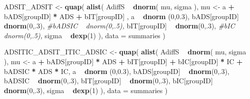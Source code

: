 \documentclass[10pt,dvipsnames,enabledeprecatedfontcommands]{scrartcl}
\newenvironment{Shaded}{\begin{snugshade}}{\end{snugshade}}
\newcommand{\KeywordTok}[1]{\textcolor[rgb]{0.13,0.29,0.53}{\textbf{#1}}}
\newcommand{\DataTypeTok}[1]{\textcolor[rgb]{0.13,0.29,0.53}{#1}}
\newcommand{\DecValTok}[1]{\textcolor[rgb]{0.00,0.00,0.81}{#1}}
\newcommand{\FloatTok}[1]{\textcolor[rgb]{0.00,0.00,0.81}{#1}}
\newcommand{\StringTok}[1]{\textcolor[rgb]{0.31,0.60,0.02}{#1}}
\newcommand{\CommentTok}[1]{\textcolor[rgb]{0.56,0.35,0.01}{\textit{#1}}}
\newcommand{\OperatorTok}[1]{\textcolor[rgb]{0.81,0.36,0.00}{\textbf{#1}}}
\newcommand{\NormalTok}[1]{#1}
\begin{document}
\begin{Shaded}
\begin{Highlighting}[]
\NormalTok{ADSIT_ADSIT <-}\StringTok{ }\KeywordTok{quap}\NormalTok{(}
  \KeywordTok{alist}\NormalTok{(}
\NormalTok{    AdiffS }\OperatorTok{~}\StringTok{ }\KeywordTok{dnorm}\NormalTok{( mu, sigma ),}
\NormalTok{    mu <-}\StringTok{ }\NormalTok{a }\OperatorTok{+}\StringTok{ }\NormalTok{bADS[groupID] }\OperatorTok{*}\StringTok{ }\NormalTok{ADS }\OperatorTok{+}\StringTok{  }\NormalTok{bIT[groupID] ,}
\NormalTok{    a }\OperatorTok{~}\StringTok{ }\KeywordTok{dnorm}\NormalTok{ (}\DecValTok{0}\NormalTok{,}\FloatTok{0.3}\NormalTok{),}
\NormalTok{    bADS[groupID] }\OperatorTok{~}\StringTok{ }\KeywordTok{dnorm}\NormalTok{(}\DecValTok{0}\NormalTok{,.}\DecValTok{3}\NormalTok{),}
    \CommentTok{#bADSIC ~ dnorm(0,.5),}
\NormalTok{    bIT[groupID] }\OperatorTok{~}\StringTok{ }\KeywordTok{dnorm}\NormalTok{(}\DecValTok{0}\NormalTok{,.}\DecValTok{3}\NormalTok{),}
    \CommentTok{#bIC ~ dnorm(0,.5),}
\NormalTok{    sigma  }\OperatorTok{~}\StringTok{ }\KeywordTok{dexp}\NormalTok{(}\DecValTok{1}\NormalTok{)}
\NormalTok{  ), }
  \DataTypeTok{data =}\NormalTok{ summaries}
\NormalTok{)}


\NormalTok{ADSITIC_ADSIT_ITIC_ADSIC <-}\StringTok{ }\KeywordTok{quap}\NormalTok{(}
  \KeywordTok{alist}\NormalTok{(}
\NormalTok{    AdiffS }\OperatorTok{~}\StringTok{ }\KeywordTok{dnorm}\NormalTok{( mu, sigma ),}
\NormalTok{    mu <-}\StringTok{ }\NormalTok{a }\OperatorTok{+}\StringTok{ }\NormalTok{bADS[groupID] }\OperatorTok{*}\StringTok{ }\NormalTok{ADS }\OperatorTok{+}\StringTok{  }\NormalTok{bIT[groupID] }\OperatorTok{+}\StringTok{ }\NormalTok{bIC[groupID] }\OperatorTok{*}\StringTok{ }\NormalTok{IC }\OperatorTok{+}
\StringTok{      }\NormalTok{bADSIC }\OperatorTok{*}\StringTok{ }\NormalTok{ADS }\OperatorTok{*}\StringTok{ }\NormalTok{IC,}
\NormalTok{    a }\OperatorTok{~}\StringTok{ }\KeywordTok{dnorm}\NormalTok{ (}\DecValTok{0}\NormalTok{,}\FloatTok{0.3}\NormalTok{),}
\NormalTok{    bADS[groupID] }\OperatorTok{~}\StringTok{ }\KeywordTok{dnorm}\NormalTok{(}\DecValTok{0}\NormalTok{,.}\DecValTok{3}\NormalTok{),}
\NormalTok{    bADSIC }\OperatorTok{~}\StringTok{ }\KeywordTok{dnorm}\NormalTok{(}\DecValTok{0}\NormalTok{,.}\DecValTok{3}\NormalTok{),}
\NormalTok{    bIT[groupID] }\OperatorTok{~}\StringTok{ }\KeywordTok{dnorm}\NormalTok{(}\DecValTok{0}\NormalTok{,.}\DecValTok{3}\NormalTok{),}
\NormalTok{    bIC[groupID] }\OperatorTok{~}\StringTok{ }\KeywordTok{dnorm}\NormalTok{(}\DecValTok{0}\NormalTok{,.}\DecValTok{3}\NormalTok{),}
\NormalTok{    sigma  }\OperatorTok{~}\StringTok{ }\KeywordTok{dexp}\NormalTok{(}\DecValTok{1}\NormalTok{)}
\NormalTok{  ), }
  \DataTypeTok{data =}\NormalTok{ summaries}
\NormalTok{)}



\end{Highlighting}
\end{Shaded}
\end{document}
